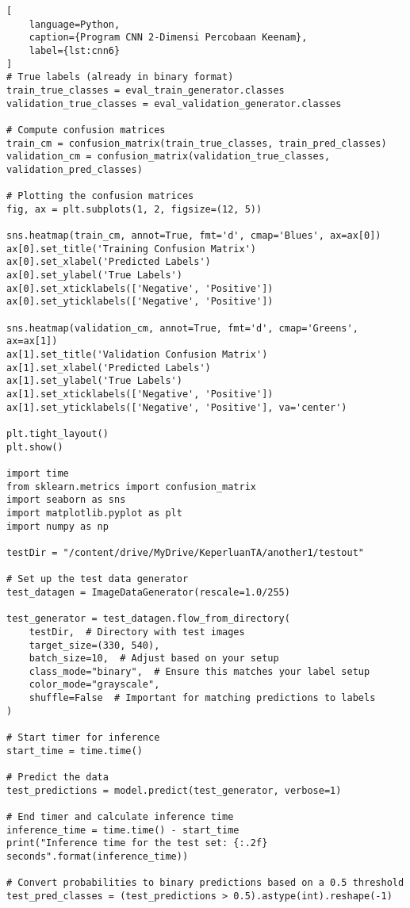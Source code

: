 \begin{lstlisting}[
    language=Python,
    caption={Program CNN 2-Dimensi Percobaan Keenam},
    label={lst:cnn6}
]
# True labels (already in binary format)
train_true_classes = eval_train_generator.classes
validation_true_classes = eval_validation_generator.classes

# Compute confusion matrices
train_cm = confusion_matrix(train_true_classes, train_pred_classes)
validation_cm = confusion_matrix(validation_true_classes, validation_pred_classes)

# Plotting the confusion matrices
fig, ax = plt.subplots(1, 2, figsize=(12, 5))

sns.heatmap(train_cm, annot=True, fmt='d', cmap='Blues', ax=ax[0])
ax[0].set_title('Training Confusion Matrix')
ax[0].set_xlabel('Predicted Labels')
ax[0].set_ylabel('True Labels')
ax[0].set_xticklabels(['Negative', 'Positive'])
ax[0].set_yticklabels(['Negative', 'Positive'])

sns.heatmap(validation_cm, annot=True, fmt='d', cmap='Greens', ax=ax[1])
ax[1].set_title('Validation Confusion Matrix')
ax[1].set_xlabel('Predicted Labels')
ax[1].set_ylabel('True Labels')
ax[1].set_xticklabels(['Negative', 'Positive'])
ax[1].set_yticklabels(['Negative', 'Positive'], va='center')

plt.tight_layout()
plt.show()

import time
from sklearn.metrics import confusion_matrix
import seaborn as sns
import matplotlib.pyplot as plt
import numpy as np

testDir = "/content/drive/MyDrive/KeperluanTA/another1/testout"

# Set up the test data generator
test_datagen = ImageDataGenerator(rescale=1.0/255)

test_generator = test_datagen.flow_from_directory(
    testDir,  # Directory with test images
    target_size=(330, 540),
    batch_size=10,  # Adjust based on your setup
    class_mode="binary",  # Ensure this matches your label setup
    color_mode="grayscale",
    shuffle=False  # Important for matching predictions to labels
)

# Start timer for inference
start_time = time.time()

# Predict the data
test_predictions = model.predict(test_generator, verbose=1)

# End timer and calculate inference time
inference_time = time.time() - start_time
print("Inference time for the test set: {:.2f} seconds".format(inference_time))

# Convert probabilities to binary predictions based on a 0.5 threshold
test_pred_classes = (test_predictions > 0.5).astype(int).reshape(-1)


\end{lstlisting}
